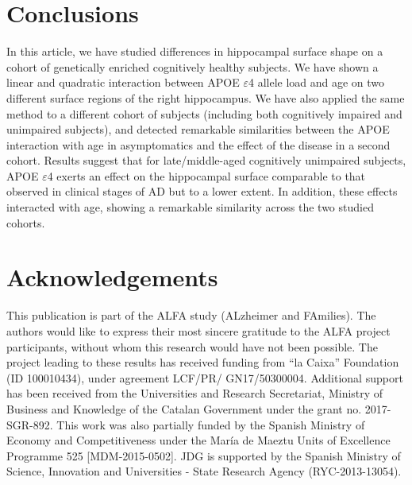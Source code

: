 \section{Conclusions}
\label{sec:conclusions}

In this article, we have studied differences in hippocampal surface shape on a cohort of genetically enriched cognitively healthy subjects. We have shown a linear and quadratic interaction between APOE $\varepsilon$4 allele load and age on two different surface regions of the right hippocampus. We have also applied the same method to a different cohort of subjects (including both cognitively impaired and unimpaired subjects), and detected remarkable similarities between the APOE interaction with age in asymptomatics and the effect of the disease in a second cohort. Results suggest that for late/middle-aged cognitively unimpaired subjects, APOE $\varepsilon$4 exerts an effect on the hippocampal surface comparable to that observed in clinical stages of AD but to a lower extent. In addition, these effects interacted with age, showing a remarkable similarity across the two studied cohorts. \\

\section*{Acknowledgements}
This publication is part of the ALFA study (ALzheimer and FAmilies). The authors would like to express their most sincere gratitude to the ALFA project participants, without whom this research would have not been possible. The project leading to these results has received funding from “la Caixa” Foundation (ID 100010434), under agreement LCF/PR/ GN17/50300004. Additional support has been received from the Universities and Research Secretariat, Ministry of Business and Knowledge of the Catalan Government under the grant no. 2017-SGR-892. This work was also partially funded by the Spanish Ministry of Economy and Competitiveness under the María de Maeztu Units of Excellence Programme 525 [MDM-2015-0502]. JDG is supported by the Spanish Ministry of Science, Innovation and Universities - State Research Agency (RYC-2013-13054). \\

